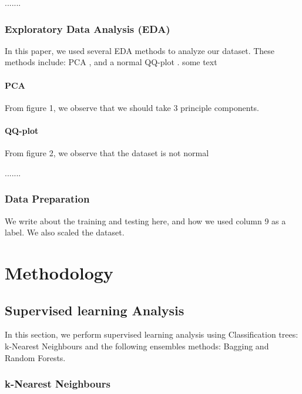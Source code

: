 \documentclass[12pt]{article}
\begin{document}
.......

\subsubsection{Exploratory Data Analysis (EDA)}
In this paper, we used several EDA methods to analyze our dataset. These methods include: PCA \cite{kurita2019principal}, and a normal QQ-plot \cite{marden2004positions}. some text \cite{Lecture2}
\paragraph{PCA}

From figure 1, we observe that we should take 3 principle components.



\paragraph{QQ-plot}

From figure 2, we observe that the dataset is not normal


.......
\subsubsection{Data Preparation} 

We write about the training and testing here, and how we used column 9 as a label. We also scaled the dataset.\\

\section{Methodology}
\subsection{Supervised learning Analysis} 
 In this section, we perform supervised learning analysis using Classification trees: k-Nearest Neighbours and the following ensembles methods: Bagging and Random Forests.\cite{zhou2012ensemble}
 
 \subsubsection{k-Nearest Neighbours}
\end{document}
